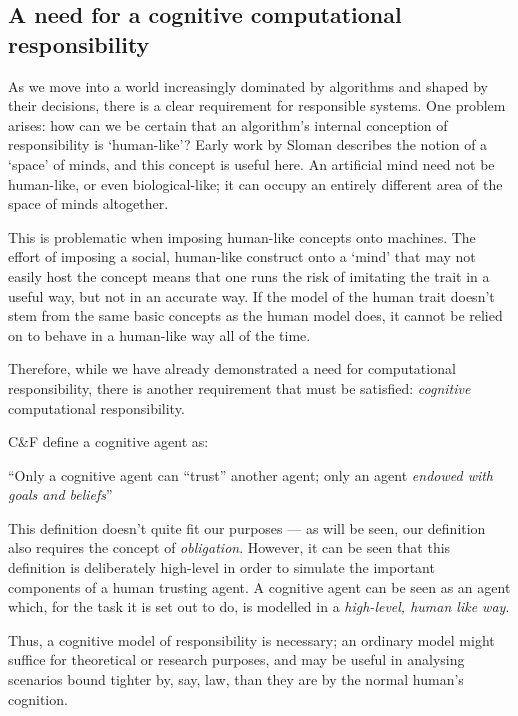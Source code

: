 \subsection{A need for a cognitive computational responsibility}

As we move into a world increasingly dominated by algorithms and shaped by their decisions, there is a clear requirement for responsible systems. One problem arises: how can we be certain that an algorithm's internal conception of responsibility is `human-like'? Early work by Sloman describes the notion of a `space' of minds\cite{Sloman1984TheMinds}, and this concept is useful here. An artificial mind need not be human-like, or even biological-like; it can occupy an entirely different area of the space of minds altogether. \par

This is problematic when imposing human-like concepts onto machines. The effort of imposing a social, human-like construct onto a `mind' that may not easily host the concept means that one runs the risk of imitating the trait in a useful way, but not in an accurate way. If the model of the human trait doesn't stem from the same basic concepts as the human model does, it cannot be relied on to behave in a human-like way all of the time. \par

Therefore, while we have already demonstrated a need for computational responsibility, there is another requirement that must be satisfied: \emph{cognitive} computational responsibility. \par

C\&F define a cognitive agent as:
\begin{displayquote}
``Only a cognitive agent can ``trust'' another agent; only an agent \emph{endowed with goals and beliefs}''
\end{displayquote}\par

This definition doesn't quite fit our purposes --- as will be seen, our definition also requires the concept of \emph{obligation}. However, it can be seen that this definition is deliberately high-level in order to simulate the important components of a human trusting agent. A cognitive agent can be seen as an agent which, for the task it is set out to do, is modelled in a \emph{high-level, human like way}. \par

Thus, a cognitive model of responsibility is necessary; an ordinary model might suffice for theoretical or research purposes, and may be useful in analysing scenarios bound tighter by, say, law, than they are by the normal human's cognition.\par



